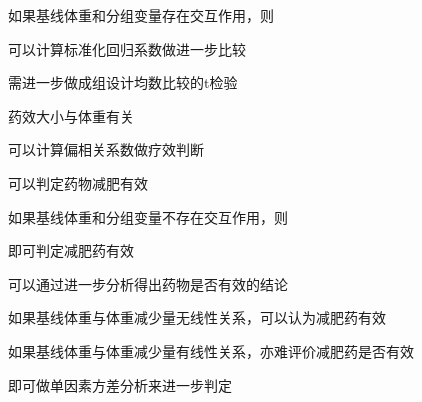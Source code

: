\par\addvspace{6pt}\noindent\begin{minipage}{\linewidth}


如果基线体重和分组变量存在交互作用，则


\begin{choices}

\item 可以计算标准化回归系数做进一步比较

\item 需进一步做成组设计均数比较的t检验

\item 药效大小与体重有关

\item 可以计算偏相关系数做疗效判断

\item 可以判定药物减肥有效

\end{choices}

\end{minipage}\par\vspace{4pt}

\par\addvspace{6pt}\noindent\begin{minipage}{\linewidth}


如果基线体重和分组变量不存在交互作用，则


\begin{choices}

\item 即可判定减肥药有效

\item 可以通过进一步分析得出药物是否有效的结论

\item 如果基线体重与体重减少量无线性关系，可以认为减肥药有效

\item 如果基线体重与体重减少量有线性关系，亦难评价减肥药是否有效

\item 即可做单因素方差分析来进一步判定

\end{choices}

\end{minipage}\par\vspace{4pt}

